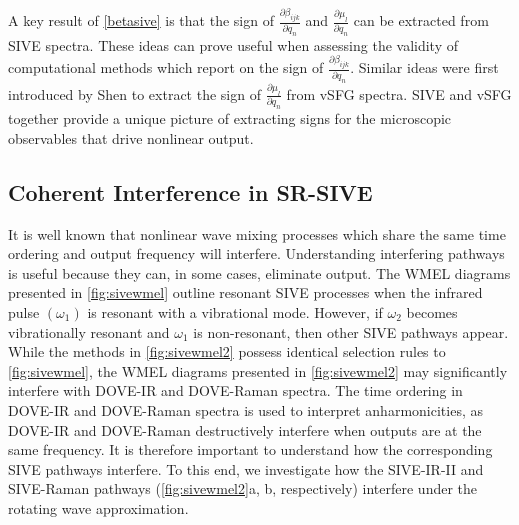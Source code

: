 \documentclass[aip, jcp, draft, onecolumn]{revtex4-2}
\begin{document}
A key result of \autoref{betasive} is that the sign of $\frac{\partial \beta_{ijk}}{\partial q_n}$ and $\frac{\partial \mu_{l}}{\partial q_n}$ can be extracted from SIVE spectra. 
These ideas can prove useful when assessing the validity of computational methods which report on the sign of $\frac{\partial \beta_{ijk}}{\partial q_n}$.
Similar ideas were first introduced by Shen to extract the sign of $\frac{\partial \mu_{l}}{\partial q_n}$ from vSFG spectra.\cite{Shen90}
SIVE and vSFG together provide a unique picture of extracting signs for the microscopic observables that drive nonlinear output.



\subsection{Coherent Interference in SR-SIVE}
It is well known that nonlinear wave mixing processes which share the same time ordering and output frequency will interfere. \cite{RN135, Bonn2024}
Understanding interfering pathways is useful because they can, in some cases, eliminate output. \cite{RN342, RN135}
The WMEL diagrams presented in \autoref{fig:sivewmel} outline resonant SIVE processes when the infrared pulse $(\omega_1)$ is resonant with a vibrational mode. 
However, if $\omega_2$ becomes vibrationally resonant and $\omega_1$ is non-resonant, then other SIVE pathways appear.\cite{McDonnell2024} 
While the methods in \autoref{fig:sivewmel2} possess identical selection rules to \autoref{fig:sivewmel}, the WMEL diagrams presented in \autoref{fig:sivewmel2} may significantly interfere with DOVE-IR and DOVE-Raman spectra.
The time ordering in DOVE-IR and DOVE-Raman spectra is used to interpret anharmonicities, as DOVE-IR and DOVE-Raman destructively interfere when outputs are at the same frequency. \cite{RN135, RN324}
It is therefore important to understand how the corresponding SIVE pathways interfere.
To this end, we investigate how the SIVE-IR-II and SIVE-Raman pathways (\autoref{fig:sivewmel2}a, b, respectively) interfere under the rotating wave approximation. 
\end{document}
